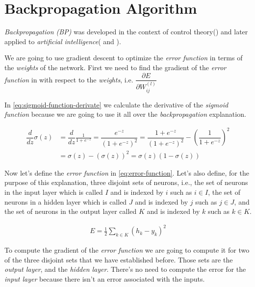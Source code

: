 \section{Backpropagation Algorithm}

\textit{Backpropagation (BP)} was developed in the context of control
theory(\cite{kelley1960gradient}) and later applied to
\textit{artificial intelligence}(\cite{werbos1974beyond} and
\cite{rumelhart1988learning}).

We are going to use gradient descent to optimize the \textit{error
function} in terms of the \textit{weights} of the network. First we
need to find the gradient of the \textit{error function} in with
respect to the \textit{weights}, i.e. $\dfrac{\partial E}{\partial
  W_{ij}^{(l)}}$

In \autoref{eq:sigmoid-function-derivate} we calculate the derivative
of the \textit{sigmoid function} because we are going to use it all
over the \textit{backpropagation} explanation.

\begin{equation}
  \begin{aligned}
    \label{eq:sigmoid-function-derivate}
    \dfrac{d}{dz} \sigma(z) & = \dfrac{d}{dz} \frac{1}{1 + e^{-z}} =
    \dfrac{e^{-z}}{(1 + e^{-z})^2} = \dfrac{1 + e^{-z}}{(1 +
      e^{-z})^2} - \left( \dfrac{1}{1 + e^{-z}} \right)^2 \\
    & = \sigma(z) - (\sigma(z))^2 = \sigma(z)(1-\sigma(z))
  \end{aligned}
\end{equation}

Now let's define the \textit{error function} in
\autoref{eq:error-function}. Let's also define, for the purpose of
this explanation, three disjoint sets of neurons, i.e., the set of
neurons in the input layer which is called $I$ and is indexed by $i$
such as $ i \in I$, the set of neurons in a hidden layer which is
called $J$ and is indexed by $j$ such as $j \in J$, and the set of
neurons in the output layer called $K$ and is indexed by $k$ such as
$k \in K$.

\begin{equation}
  \begin{aligned}
    \label{eq:error-function}
    E = \frac{1}{2} \sum_{k \in K} (h_k - y_k)^2
  \end{aligned}
\end{equation}

To compute the gradient of the \textit{error function} we are going to
compute it for two of the three disjoint sets that we have established
before. Those sets are the \textit{output layer}, and the
\textit{hidden layer}. There's no need to compute the error for the
\textit{input layer} because there isn't an error associated with the
inputs.


